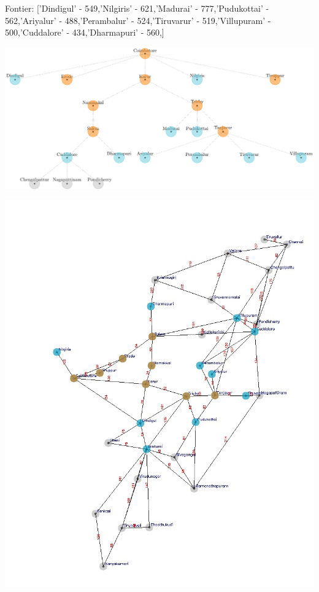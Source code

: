 \documentclass[xcolor=table]{beamer}
\begin{document}
\begin{frame}
  { \tiny Fontier: ['Dindigul' - 549,'Nilgiris' - 621,'Madurai' - 777,'Pudukottai' - 562,'Ariyalur' - 488,'Perambalur' - 524,'Tiruvarur' - 519,'Villupuram' - 500,'Cuddalore' - 434,'Dharmapuri' - 560,]}
  \begin{center}
  \includegraphics[height=0.35\textheight]{../AStarNode/10-1.png}
  \end{center}
  \begin{center}
    \includegraphics[height=0.55\textheight]{../AStaroutput/tamilAStar8.jpg}
  \end{center}
\end{frame}
\end{document}
